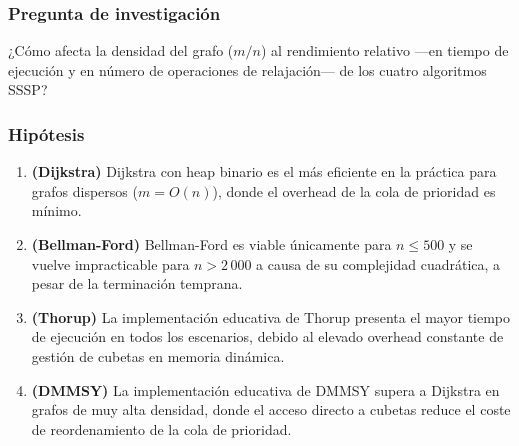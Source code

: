 \subsubsection*{Pregunta de investigación}

¿Cómo afecta la densidad del grafo ($m/n$) al rendimiento relativo —en tiempo
de ejecución y en número de operaciones de relajación— de los cuatro
algoritmos SSSP?

\subsubsection*{Hipótesis}

\begin{enumerate}[label=\textbf{H\arabic{enumi}.}]
  \item \textbf{(Dijkstra)} Dijkstra con heap binario es el más eficiente en
    la práctica para grafos dispersos ($m = O(n)$), donde el overhead de la
    cola de prioridad es mínimo.
  \item \textbf{(Bellman-Ford)} Bellman-Ford es viable únicamente para $n \leq
    500$ y se vuelve impracticable para $n > 2\,000$ a causa de su complejidad
    cuadrática, a pesar de la terminación temprana.
  \item \textbf{(Thorup)} La implementación educativa de Thorup presenta el
    mayor tiempo de ejecución en todos los escenarios, debido al elevado
    overhead constante de gestión de cubetas en memoria dinámica.
  \item \textbf{(DMMSY)} La implementación educativa de DMMSY supera a
    Dijkstra en grafos de muy alta densidad, donde el acceso directo a cubetas
    reduce el coste de reordenamiento de la cola de prioridad.
\end{enumerate}
